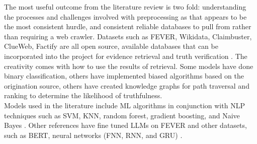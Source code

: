 \documentclass[11pt,letterpaper]{article}
\begin{document}
{    The most useful outcome from the literature review is two fold: understanding the processes and
    challenges involved with preprocessing as that appears to be the most consistent hurdle, and consistent reliable databases to pull from rather than requiring a web crawler. Datasets such as FEVER,
    Wikidata, Claimbuster, ClueWeb, Factify are all open source, available databases that can be incorporated into the project for evidence retrieval and truth verification \cite{afc_survey}. The creativity comes with
    how to use the results of retrieval. Some models have done binary classification, others have implemented biased algorithms based on the origination source, others have created knowledge graphs
    for path traversal and ranking to determine the likelihood of truthfulness. \\

    Models used in the literature include ML algorithms in conjunction with NLP techniques such as
    SVM, KNN, random forest, gradient boosting, and Naive Bayes \cite{automated_fact_check, afc_survey, truth_is_universal}. Other references have fine tuned
    LLMs on FEVER and other datasets, such as BERT, neural networks (FNN, RNN, and GRU) \cite{gru}.

}
\end{document}
